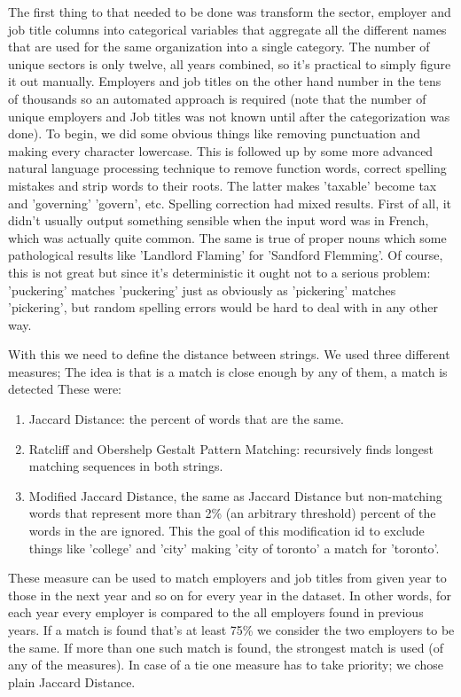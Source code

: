 \documentclass{article}
\begin{document}
The first thing to that needed to be done was transform the  sector, employer
and job title columns into categorical variables that aggregate all the
different names that are used for the same organization into a single category.
The number of unique sectors is only twelve, all years combined, so it's
practical to simply figure it out manually. Employers and job titles on the
other hand number in the tens of thousands so an automated approach is required
(note that the number of unique employers and Job titles was not known until
after the categorization was done).  To begin, we did some obvious things like
removing punctuation and making every character lowercase. This is followed up
by some more advanced natural language processing technique to remove function
words, correct spelling mistakes and strip words to their roots. The latter
makes 'taxable' become tax and 'governing' 'govern', etc.  Spelling
correction had mixed results. First of all, it didn't usually output something
sensible when the input word was in French, which was actually quite common.
The same is true of proper nouns which some pathological results like 'Landlord
Flaming' for 'Sandford Flemming'.  Of course, this is not great but since it's
deterministic it ought not to a serious problem: 'puckering' matches
'puckering' just as obviously as 'pickering' matches 'pickering', but random
spelling errors would be hard to deal with in any other way.


With this we need to define the distance between strings.  We  used three
different measures; The idea is that is a match is close enough by any of them,
a match is detected These were:

\begin{enumerate}
    \item Jaccard Distance: the percent of words that are the same.
    \item Ratcliff and Obershelp Gestalt Pattern Matching: recursively finds
        longest matching sequences in both strings.
    \item Modified Jaccard Distance, the same as Jaccard Distance but 
        non-matching words that represent more than 2\% (an arbitrary 
        threshold) percent of the words in the are ignored. This the goal
        of this modification id to exclude things like 'college' and 'city'
        making 'city of toronto' a match for 'toronto'.
\end{enumerate}    

These measure can be used to match employers and job titles from given year to
those in the next year and so on for every year in the dataset. In other words,
for each year every employer is compared to the all employers found in
previous years. If a match is found that's at least 75\% we consider the two
employers to be the same.  If more than one such match is found, the strongest
match is used (of any of the measures). In case of a tie one measure has to
take priority; we chose plain Jaccard Distance.
\end{document}

